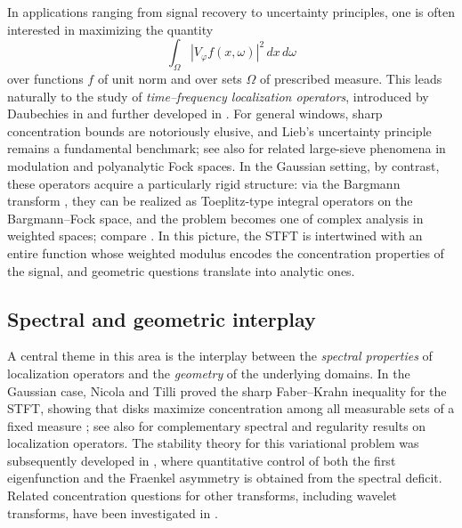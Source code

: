 \documentclass[a4paper,11pt,reqno]{amsart}
\numberwithin{equation}{section}
\theoremstyle{plain} %
\theoremstyle{definition} %
\theoremstyle{remark}
\begin{document}
In applications ranging from signal recovery to uncertainty principles, one is often interested in maximizing the quantity
\[
\int_\Omega |V_\varphi f(x,\omega)|^2\,dx\,d\omega
\]
over functions $f$ of unit norm and over sets $\Omega$ of prescribed measure. This leads naturally to the study of \emph{time--frequency localization operators}, introduced by Daubechies in \cite{Daubechies} and further developed in \cite{Daubechies-Paul,Ramanathan-Topiwala-Weyl,Ramanathan-Topiwala-Spectrogram,Cordero-Grochenig,Boggiatto-Cordero-Grochenig,Bayer-Grochenig,Kisil-CrossToeplitz,Nicola-Tilli-2,Ramos-time-frequency}. For general windows, sharp concentration bounds are notoriously elusive, and Lieb's uncertainty principle \cite{Lieb} remains a fundamental benchmark; see also \cite{abreu2021donoho} for related large-sieve phenomena in modulation and polyanalytic Fock spaces. In the Gaussian setting, by contrast, these operators acquire a particularly rigid structure: via the Bargmann transform \cite{Bargmann}, they can be realized as Toeplitz-type integral operators on the Bargmann--Fock space, and the problem becomes one of complex analysis in weighted spaces; compare \cite{Berezin,Berger-Coburn-Symbol,Berger-Coburn,Berger-Coburn-Heat,Zhu,Grochenig,Folland}. In this picture, the STFT is intertwined with an entire function whose weighted modulus encodes the concentration properties of the signal, and geometric questions translate into analytic ones.

\subsection{Spectral and geometric interplay}

A central theme in this area is the interplay between the \emph{spectral properties} of localization operators and the \emph{geometry} of the underlying domains. In the Gaussian case, Nicola and Tilli proved the sharp Faber--Krahn inequality for the STFT, showing that disks maximize concentration among all measurable sets of a fixed measure \cite{Nicola-Tilli}; see also \cite{Nicola-Tilli-2,Bastianoni-Cordero-Nicola,Bastianoni-Teofanov} for complementary spectral and regularity results on localization operators. The stability theory for this variational problem was subsequently developed in \cite{Gomez-Guerra-Ramos-Tilli}, where quantitative control of both the first eigenfunction and the Fraenkel asymmetry is obtained from the spectral deficit. Related concentration questions for other transforms, including wavelet transforms, have been investigated in \cite{Ramos-Tilli}.
\end{document}
